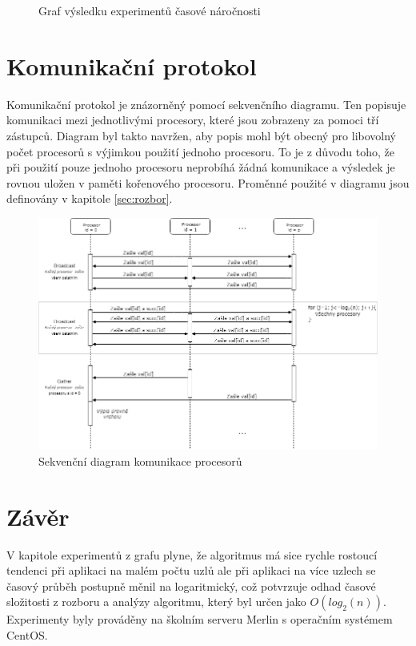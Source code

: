 \documentclass[12pt, a4paper]{article}
\begin{document}
\begin{figure}[h]\centering
	\label{fig:experimenty}
	\caption{Graf výsledku experimentů časové náročnosti}	
\end{figure}

\section{Komunikační protokol}
Komunikační protokol je znázorněný pomocí sekvenčního diagramu. Ten popisuje komunikaci mezi jednotlivými procesory, které jsou zobrazeny za pomoci tří zástupců. Diagram byl takto navržen, aby popis mohl být obecný pro libovolný počet procesorů s výjimkou použití jednoho procesoru. To je z důvodu toho, že při použití pouze jednoho procesoru neprobíhá žádná komunikace a výsledek je rovnou uložen v paměti kořenového procesoru. Proměnné použité v diagramu jsou definovány v kapitole \ref{sec:rozbor}.

\begin{figure}[H]
	\centering
	\includegraphics[scale=0.53]{pics/seq.png}
	\caption{Sekvenční diagram komunikace procesorů}	
\end{figure}


\section{Závěr}
V kapitole experimentů z grafu plyne, že algoritmus má sice rychle rostoucí tendenci při aplikaci na malém počtu uzlů ale při aplikaci na více uzlech se časový průběh postupně měnil na logaritmický, což potvrzuje odhad časové složitosti z rozboru a analýzy algoritmu, který byl určen jako $O(log_{2}(n))$. Experimenty byly prováděny na školním serveru Merlin s operačním systémem CentOS.
\end{document}
